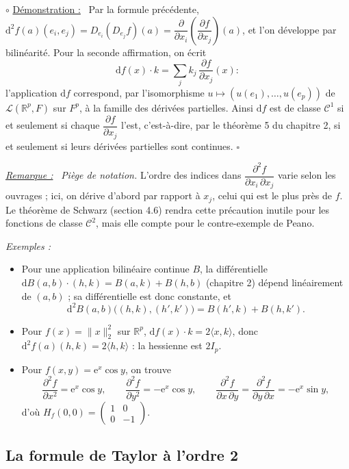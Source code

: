\documentclass[a4paper,twoside]{report}
\newenvironment{demo}%
 {\par\needspace{4\baselineskip}\vspace{1mm}\noindent$\circ$ \underline{Démonstration :}~\setlength{\parskip}{3pt plus 1pt}}%
 {\hfill$\square$\par\vspace{2mm}}
\newenvironment{remarque}%
 {\par\needspace{6\baselineskip}\vspace{1mm}\begin{list}{}{\leftmargin=1cm \rightmargin=0.5cm}\item[]%
  \textit{\underline{Remarque :}}~}%
 {\end{list}\vspace{1mm}}
\newenvironment{exemples}%
 {\par\needspace{6\baselineskip}\vspace{1mm}\begin{list}{}{\leftmargin=1cm \rightmargin=0.5cm}\item[]%
  \textit{Exemples :}%
  \begin{itemize}[label=$\bullet$,leftmargin=0.45cm,topsep=3pt,itemsep=4pt]}%
 {\end{itemize}\end{list}\vspace{1mm}}
\newcommand{\R}{\mathbb{R}}
\newcommand{\ee}{\mathrm{e}}                      %
\newcommand{\dd}{\mathrm{d}}                      %
\newcommand{\norme}[1]{\lVert #1 \rVert}         %
\newcommand{\ps}[2]{\langle #1, #2 \rangle}       %
\newcommand{\Cc}{\mathcal{C}}                     %
\newcommand{\Lc}{\mathcal{L}}                     %
\newcommand{\dpd}[2]{\dfrac{\partial #1}{\partial #2}}  %
\newcommand{\Hs}{H}                               %
\begin{document}
\begin{demo}
Par la formule précédente, $\dd^{2} f(a)(e_{i}, e_{j}) = D_{e_{i}}(D_{e_{j}} f)(a) = \dpd{}{x_{i}}\left(\dpd{f}{x_{j}}\right)(a)$, et l'on développe par bilinéarité. Pour la seconde affirmation, on écrit
\[ \dd f(x)\cdot k = \sum_{j} k_{j}\,\frac{\partial f}{\partial x_{j}}(x) : \]
l'application $\dd f$ correspond, par l'isomorphisme $u \mapsto (u(e_{1}), \dots, u(e_{p}))$ de $\Lc(\R^{p}, F)$ sur $F^{p}$, à la famille des dérivées partielles. Ainsi $\dd f$ est de classe $\Cc^{1}$ si et seulement si chaque $\dpd{f}{x_{j}}$ l'est, c'est-à-dire, par le théorème 5 du chapitre 2, si et seulement si leurs dérivées partielles sont continues.
\end{demo}

\begin{remarque}
\emph{Piège de notation.} L'ordre des indices dans $\dfrac{\partial^{2} f}{\partial x_{i}\,\partial x_{j}}$ varie selon les ouvrages ; ici, on dérive d'abord par rapport à $x_{j}$, celui qui est le plus près de $f$. Le théorème de Schwarz (section 4.6) rendra cette précaution inutile pour les fonctions de classe $\Cc^{2}$, mais elle compte pour le contre-exemple de Peano.
\end{remarque}

\begin{exemples}
  \item Pour une application bilinéaire continue $B$, la différentielle $\dd B(a, b)\cdot(h, k) = B(a, k) + B(h, b)$ (chapitre 2) dépend linéairement de $(a, b)$ ; sa différentielle est donc constante, et
  \[ \dd^{2} B(a, b)\big((h, k), (h', k')\big) = B(h', k) + B(h, k'). \]
  \item Pour $f(x) = \norme{x}_{2}^{2}$ sur $\R^{p}$, $\dd f(x)\cdot k = 2\ps{x}{k}$, donc $\dd^{2} f(a)(h, k) = 2\ps{h}{k}$ : la hessienne est $2I_{p}$.
  \item Pour $f(x, y) = \ee^{x}\cos y$, on trouve
  \[ \frac{\partial^{2} f}{\partial x^{2}} = \ee^{x}\cos y, \qquad \frac{\partial^{2} f}{\partial y^{2}} = -\ee^{x}\cos y, \qquad \frac{\partial^{2} f}{\partial x\,\partial y} = \frac{\partial^{2} f}{\partial y\,\partial x} = -\ee^{x}\sin y, \]
  d'où $\Hs_{f}(0, 0) = \begin{pmatrix} 1 & 0 \\ 0 & -1 \end{pmatrix}$.
\end{exemples}

\subsection{La formule de Taylor à l'ordre 2}
\end{document}
